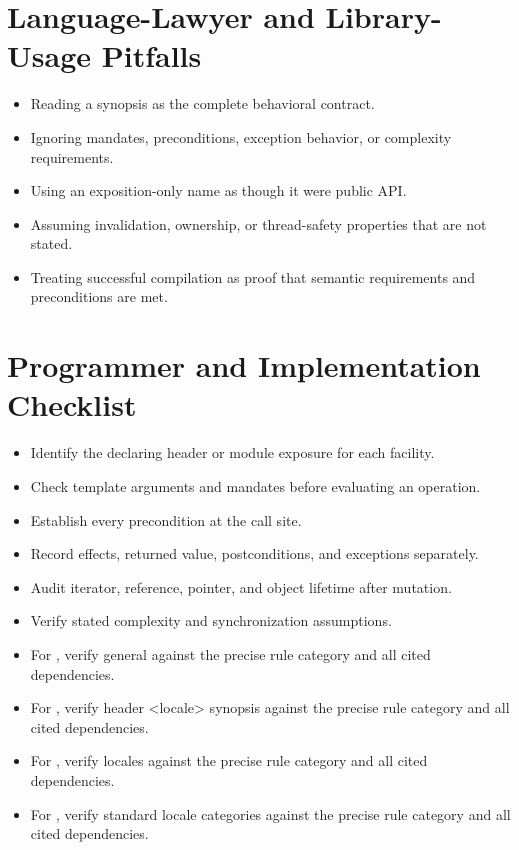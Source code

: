 \documentclass[11pt,letterpaper]{article}
\begin{document}
\section{Language-Lawyer and Library-Usage Pitfalls}
\begin{CornellReferencePitfallBox}\begin{itemize}[label=\textcolor{CornellReferenceAmber}{$\blacktriangleright$}]
\item Reading a synopsis as the complete behavioral contract.
\item Ignoring mandates, preconditions, exception behavior, or complexity requirements.
\item Using an exposition-only name as though it were public API.
\item Assuming invalidation, ownership, or thread-safety properties that are not stated.
\item Treating successful compilation as proof that semantic requirements and preconditions are met.
\end{itemize}\end{CornellReferencePitfallBox}
\section{Programmer and Implementation Checklist}
\begin{CornellReferenceChecklistBox}\begin{itemize}[label=$\square$]
\item Identify the declaring header or module exposure for each facility.
\item Check template arguments and mandates before evaluating an operation.
\item Establish every precondition at the call site.
\item Record effects, returned value, postconditions, and exceptions separately.
\item Audit iterator, reference, pointer, and object lifetime after mutation.
\item Verify stated complexity and synchronization assumptions.
\item For , verify general against the precise rule category and all cited dependencies.
\item For , verify header <locale> synopsis against the precise rule category and all cited dependencies.
\item For , verify locales against the precise rule category and all cited dependencies.
\item For , verify standard locale categories against the precise rule category and all cited dependencies.
\end{itemize}\end{CornellReferenceChecklistBox}
\end{document}
